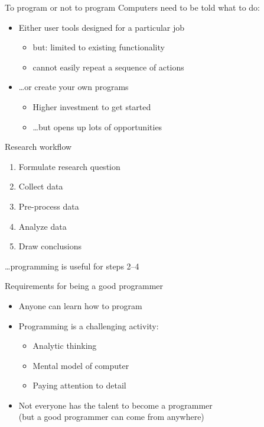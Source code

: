 \documentclass[aspectratio=169,usenames,dvipsnames]{beamer}
\begin{document}
\begin{frame}{To program or not to program}
    Computers need to be told what to do:

    \begin{itemize}
        \item Either user tools designed for a particular job
            \begin{itemize}
                \item but: limited to existing functionality
                \item cannot easily repeat a sequence of actions
            \end{itemize}

        \item \dots or create your own programs
            \begin{itemize}
                \item Higher investment to get started
                \item \dots but opens up lots of opportunities
            \end{itemize}
    \end{itemize}
\end{frame}

\begin{frame}{Research workflow}
    \begin{enumerate}
        \item Formulate research question
        \item Collect data
        \item Pre-process data
        \item Analyze data
        \item Draw conclusions
    \end{enumerate}

    \pause
    \dots programming is useful for steps 2--4
\end{frame}

\begin{frame}{Requirements for being a good programmer}
    \begin{itemize}
        \item Anyone can learn how to program
        \item Programming is a challenging activity:
            \begin{itemize}
                \item Analytic thinking
                \item Mental model of computer
                \item Paying attention to detail
            \end{itemize}
        \item Not everyone has the talent to become
            a  programmer \\
            {\footnotesize (but a good programmer can come from anywhere)}
    \end{itemize}
\end{frame}
\end{document}
